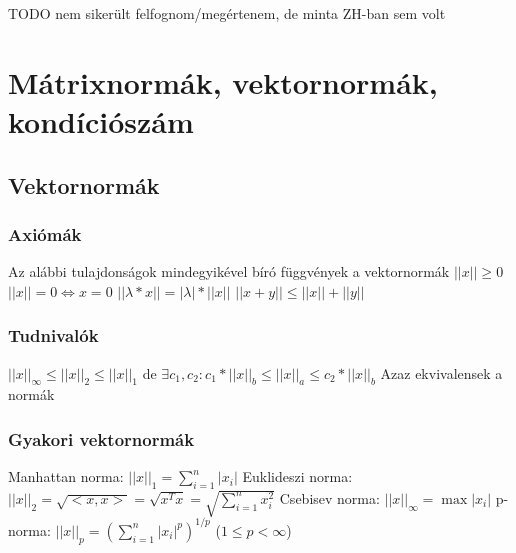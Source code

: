 \documentclass[12pt,a4paper]{article}
\begin{document}
\begin{outline}
	\1 TODO nem sikerült felfognom/megértenem, de minta ZH-ban sem volt
\end{outline}

\pagebreak


\section{Mátrixnormák, vektornormák, kondíciószám}

\subsection{Vektornormák}

\subsubsection{Axiómák}

\begin{outline}
	\1 Az alábbi tulajdonságok mindegyikével bíró függvények a vektornormák
	\1 $||x|| \ge 0$
	\1 $||x|| = 0 \Leftrightarrow x = 0$
	\1 $||\lambda * x|| = |\lambda| * ||x||$
	\1 $||x+y|| \le ||x|| + ||y||$
\end{outline}

\subsubsection{Tudnivalók}

\begin{outline}
	\1 $||x||_\infty \le ||x||_2 \le ||x||_1$ \;de\;
	$\exists c_1,c_2: c_1*||x||_b \le ||x||_a \le c_2*||x||_b$
		\2 Azaz ekvivalensek a normák
\end{outline}

\subsubsection{Gyakori vektornormák}

\begin{outline}
	\1 Manhattan norma: $||x||_1 = \sum_{i=1}^n |x_i|$
	\1 Euklideszi norma: $||x||_2 = \sqrt{<x,x>} = \sqrt{x^Tx} = \sqrt{\sum_{i=1}^{n} x_i^2}$
	\1 Csebisev norma: $||x||_\infty = \max |x_i|$
	\1 p-norma: $||x||_p = (\sum_{i=1}^{n} |x_i|^p)^{1/p}$ \;\; ($1 \le p < \infty$)
\end{outline}
\end{document}
